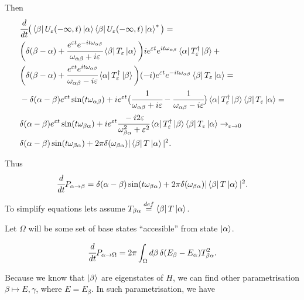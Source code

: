 \documentclass[main.tex]{subfiles}
\begin{document}
Then
\begin{align*}
&\cfrac{d}{dt} \big( \bra{\beta}U_\eepsilon(-\infty, t) \ket{\alpha}\bra{\beta}U_\eepsilon(-\infty, t) \ket{\alpha}^*\big) = \\
& \bigg(\delta(\beta - \alpha) + \cfrac{e^{\eepsilon t}e^{-it\omega_{\alpha\beta}}}{\omega_{\alpha\beta}+i\eepsilon } \bra{\beta}T_\eepsilon \ket{\alpha}\bigg)ie^{\eepsilon t}e^{it\omega_{\alpha\beta}}\bra{\alpha}T^{\dagger}_\eepsilon \ket{\beta} + \\
& \bigg(\delta(\beta - \alpha) + \cfrac{e^{\eepsilon t}e^{it\omega_{\alpha\beta}}}{\omega_{\alpha\beta}-i\eepsilon } \bra{\alpha}T^{\dagger}_\eepsilon \ket{\beta}\bigg)(-i)e^{\eepsilon t} e^{-it\omega_{\alpha\beta}}\bra{\beta}T_\eepsilon \ket{\alpha} = \\
& - \delta(\alpha - \beta) e^{\eepsilon t}\sin(t\omega_{\alpha\beta}) + ie^{\eepsilon t}\big(\cfrac{1}{\omega_{\alpha\beta}+i\eepsilon} - \cfrac{1}{\omega_{\alpha\beta}-i\eepsilon}\big)\bra{\alpha}T^{\dagger}_\eepsilon \ket{\beta} \bra{\beta}T_\eepsilon \ket{\alpha} = \\
& \delta(\alpha - \beta) e^{\eepsilon t}\sin(t\omega_{\beta\alpha})
+ i e^{\eepsilon t} \cfrac{-i2\eepsilon}{\omega_{\beta\alpha}^2 + \eepsilon^2} \bra{\alpha}T^{\dagger}_\eepsilon \ket{\beta} \bra{\beta}T_\eepsilon \ket{\alpha} \to_{\eepsilon\to 0}\\
&\delta(\alpha - \beta) \sin(t\omega_{\beta\alpha}) + 2\pi\delta(\omega_{\beta\alpha})
|\bra{\beta}T\ket{\alpha}|^2.
\end{align*}

Thus
\begin{equation}
\cfrac{d}{dt} P_{\alpha\to\beta} = \delta(\alpha - \beta) \sin(t\omega_{\beta\alpha}) + 2\pi\delta(\omega_{\beta\alpha})
|\bra{\beta}T\ket{\alpha}|^2.
\end{equation}

To simplify equations lets assume $T_{\beta\alpha} \stackrel{def}{=} \bra{\beta}T\ket{\alpha}$.

Let $\Omega$ will be some set of base states ``accesible'' from state $\ket{\alpha}$.

\begin{equation}
\cfrac{d}{dt} P_{\alpha\to{\Omega}} 
= 2\pi \int_{\Omega} d\beta \, \delta(E_\beta - E_\alpha)
T_{\beta\alpha}^2.
\end{equation}

Because we know that $\ket{\beta}$ are eigenstates of $H$, we can find other parametrisation $\beta \mapsto E, \gamma$, where $E = E_\beta$. In such parametrisation, we have
\end{document}
